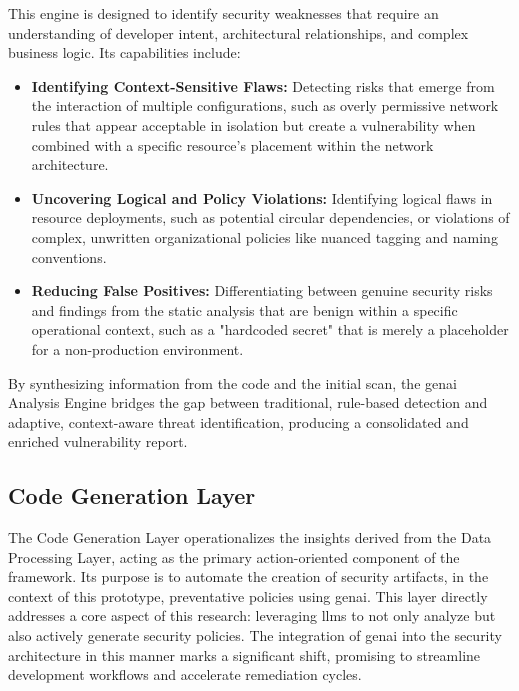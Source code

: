 This engine is designed to identify security weaknesses that require an understanding of developer intent, architectural relationships, and complex business logic\cite{noseevich_towards_2015}. Its capabilities include:

\begin{itemize}
\item \textbf{Identifying Context-Sensitive Flaws:} Detecting risks that emerge from the interaction of multiple configurations, such as overly permissive network rules that appear acceptable in isolation but create a vulnerability when combined with a specific resource's placement within the network architecture\cite{noseevich_towards_2015}.
\item \textbf{Uncovering Logical and Policy Violations:} Identifying logical flaws in resource deployments, such as potential circular dependencies, or violations of complex, unwritten organizational policies like nuanced tagging and naming conventions.
\item \textbf{Reducing False Positives:} Differentiating between genuine security risks and findings from the static analysis that are benign within a specific operational context, such as a "hardcoded secret" that is merely a placeholder for a non-production environment.
\end{itemize}

By synthesizing information from the code and the initial scan, the \gls{genai} Analysis Engine bridges the gap between traditional, rule-based detection and adaptive, context-aware threat identification, producing a consolidated and enriched vulnerability report.


\subsection{Code Generation Layer} %
\label{sec:Code Generation Laye}

The Code Generation Layer operationalizes the insights derived from the Data Processing Layer, acting as the primary action-oriented component of the framework. Its purpose is to automate the creation of security artifacts, in the context of this prototype, preventative policies using \gls{genai}. This layer directly addresses a core aspect of this research: leveraging \glspl{llm} to not only analyze but also actively generate security policies. The integration of \gls{genai} into the security architecture in this manner marks a significant shift, promising to streamline development workflows and accelerate remediation cycles\cite{kumar_generative_nodate}.

